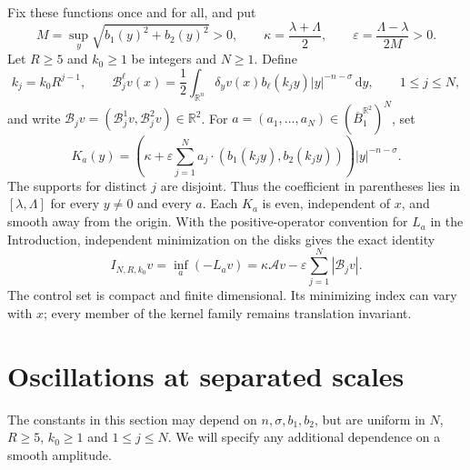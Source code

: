 \documentclass[11pt]{article}
\newcommand{\R}{\mathbb R}
\newcommand{\dd}{\,\mathrm d}
\newcommand{\A}{\mathcal A}
\newcommand{\B}{\mathcal B}
\theoremstyle{remark}
\numberwithin{equation}{section}
\begin{document}
Fix these functions once and for all, and put
\begin{equation}\label{eq:ellconstants}
 M=\sup_y\sqrt{b_1(y)^2+b_2(y)^2}>0,\qquad
 \kappa=\frac{\lambda+\Lambda}{2},\qquad
 \varepsilon=\frac{\Lambda-\lambda}{2M}>0.
\end{equation}
Let $R\ge5$ and $k_0\ge1$ be integers and $N\ge1$. Define
\[
 k_j=k_0R^{j-1},\qquad
 \B_j^\ell v(x)=\frac12\int_{\R^n}\delta_yv(x)b_\ell(k_jy)|y|^{-n-\sigma}\dd y,
 \qquad 1\le j\le N,
\]
and write $\B_jv=(\B_j^1v,\B_j^2v)\in\R^2$.
For $a=(a_1,\ldots,a_N)\in(\overline B_1^{\R^2})^N$, set
\begin{equation}\label{eq:kernel}
 K_a(y)=\left(\kappa+\varepsilon\sum_{j=1}^N a_j\cdot
                  (b_1(k_jy),b_2(k_jy))\right)|y|^{-n-\sigma}.
\end{equation}
The supports for distinct $j$ are disjoint. Thus the coefficient in
parentheses lies in $[\lambda,\Lambda]$ for every $y\ne0$ and every $a$.
Each $K_a$ is even, independent of $x$, and smooth away from the origin.
With the positive-operator convention for $L_a$ in the Introduction,
independent minimization on the disks gives the exact identity
\begin{equation}\label{eq:bellman}
 I_{N,R,k_0}v=\inf_a(-L_av)
       =\kappa\A v-\varepsilon\sum_{j=1}^N|\B_jv|.
\end{equation}
The control set is compact and finite dimensional. Its minimizing index
can vary with $x$; every member of the kernel family remains translation
invariant.

\section{Oscillations at separated scales}\label{sec:oscillation}
The constants in this section may depend on $n,\sigma,b_1,b_2$, but are
uniform in $N$, $R\ge5$, $k_0\ge1$ and $1\le j\le N$. We will specify
any additional dependence on a smooth amplitude.
\end{document}
